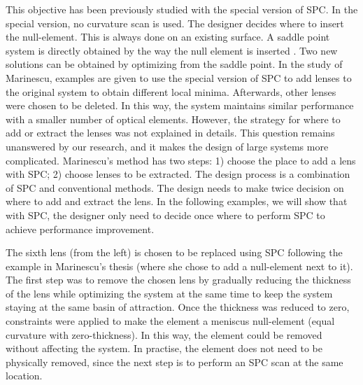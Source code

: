 This objective has been previously studied with the special version of SPC. In the special version, no curvature scan is used. The designer decides where to insert the null-element. This is always done on an existing surface. A saddle point system is directly obtained by the way the null element is inserted \cite{BociortSPCSexplained}. Two new solutions can be obtained by optimizing from the saddle point. In the study of Marinescu\cite{OanaThesis2006}\cite{OanaOEngPart2}, examples are given to use the special version of SPC to add lenses to the original system to obtain different local minima. Afterwards, other lenses were chosen to be deleted. In this way, the system maintains similar performance with a smaller number of optical elements. However, the strategy for where to add or extract the lenses was not explained in details. This question remains unanswered by our research, and it makes the design of large systems more complicated. Marinescu's method has two steps: 1) choose the place to add a lens with SPC; 2) choose lenses to be extracted. The design process is a combination of SPC and conventional methods. The design needs to make twice decision on where to add and extract the lens. In the following examples, we will show that with SPC, the designer only need to decide once where to perform SPC to achieve performance improvement. 

The sixth lens (from the left) is chosen to be replaced using SPC following the example in Marinescu's thesis (where she chose to add a null-element next to it). The first step was to remove the chosen lens by gradually reducing the thickness of the lens while optimizing the system at the same time to keep the system staying at the same basin of attraction. Once the thickness was reduced to zero, constraints were applied to make the element a meniscus null-element (equal curvature with zero-thickness). In this way, the element could be removed without affecting the system. In practise, the element does not need to be physically removed, since the next step is to perform an SPC scan at the same location. 

